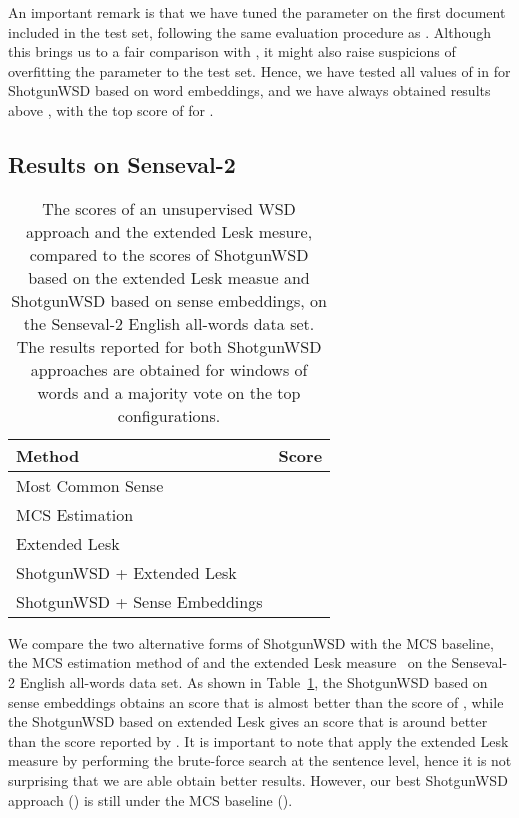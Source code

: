 \documentclass[11pt]{article}
\begin{document}
An important remark is that we have tuned the parameter  on the first document included in the test set, following the same evaluation procedure as . Although this brings us to a fair comparison with , it might also raise suspicions of overfitting the parameter  to the test set. Hence, we have tested all values of  in  for ShotgunWSD based on word embeddings, and we have always obtained results above , with the top score of  for . 

\subsection{Results on Senseval-2}

\begin{table}[h]
\small{
\begin{center}
\begin{tabular}{|l|r|}
\hline
Method 																										&  Score\\
\hline
Most Common Sense																					& \\
MCS Estimation~\cite{Bhingardive-NAACL-2015} 										& \\
Extended Lesk~\cite{Torres-Lesk-2009}														& \\
\hline
ShotgunWSD + Extended Lesk																		& \\
ShotgunWSD + Sense Embeddings																& \\
\hline
\end{tabular}
\end{center}
\caption{\label{tab_Senseval2_Results} The  scores of an unsupervised WSD approach and the extended Lesk mesure, compared to the  scores of ShotgunWSD based on the extended Lesk measue and ShotgunWSD based on sense embeddings, on the Senseval-2 English all-words data set. The results reported for both ShotgunWSD approaches are obtained for windows of  words and a majority vote on the top  configurations.}
}
\end{table}

We compare the two alternative forms of ShotgunWSD with the MCS baseline, the MCS estimation method of  and the extended Lesk measure~\cite{Torres-Lesk-2009} on the Senseval-2 English all-words data set. As shown in Table~\ref{tab_Senseval2_Results}, the ShotgunWSD based on sense embeddings obtains an  score that is almost  better than the  score of , while the ShotgunWSD based on extended Lesk gives an  score that is around  better than the  score reported by . It is important to note that  apply the extended Lesk measure by performing the brute-force search at the sentence level, hence it is not surprising that we are able obtain better results. However, our best ShotgunWSD approach () is still under the MCS baseline ().
\end{document}
